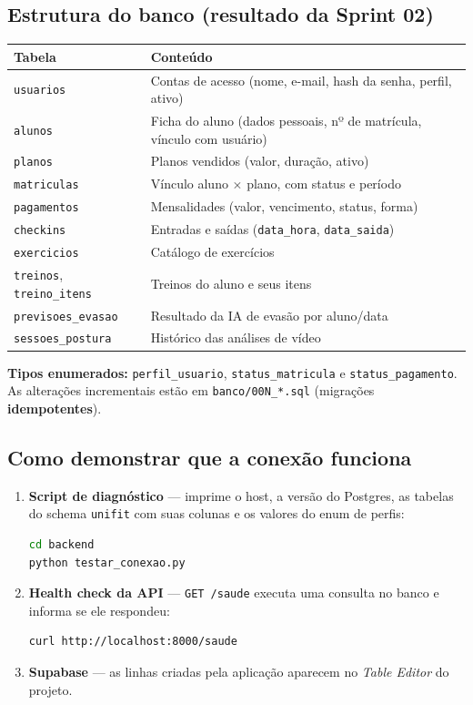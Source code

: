 \documentclass[11pt,a4paper,final]{article}
\newcommand{\cod}[1]{\texttt{#1}}
\begin{document}
\subsection{Estrutura do banco (resultado da Sprint 02)}

\begin{xltabular}{\textwidth}{l Y}
  \toprule
  \textbf{Tabela} & \textbf{Conteúdo} \\
  \midrule
  \endhead
  \cod{usuarios}          & Contas de acesso (nome, e-mail, hash da senha, perfil, ativo) \\
  \cod{alunos}            & Ficha do aluno (dados pessoais, nº de matrícula, vínculo com usuário) \\
  \cod{planos}            & Planos vendidos (valor, duração, ativo) \\
  \cod{matriculas}        & Vínculo aluno $\times$ plano, com status e período \\
  \cod{pagamentos}        & Mensalidades (valor, vencimento, status, forma) \\
  \cod{checkins}          & Entradas e saídas (\cod{data\_hora}, \cod{data\_saida}) \\
  \cod{exercicios}        & Catálogo de exercícios \\
  \cod{treinos}, \cod{treino\_itens} & Treinos do aluno e seus itens \\
  \cod{previsoes\_evasao} & Resultado da IA de evasão por aluno/data \\
  \cod{sessoes\_postura}  & Histórico das análises de vídeo \\
  \bottomrule
\end{xltabular}

\textbf{Tipos enumerados:} \cod{perfil\_usuario}, \cod{status\_matricula} e \cod{status\_pagamento}.
As alterações incrementais estão em \cod{banco/00N\_*.sql} (migrações \textbf{idempotentes}).

\subsection{Como demonstrar que a conexão funciona}

\begin{enumerate}
  \item \textbf{Script de diagnóstico} --- imprime o host, a versão do Postgres, as tabelas do schema
        \cod{unifit} com suas colunas e os valores do enum de perfis:
\begin{lstlisting}[language=bash]
cd backend
python testar_conexao.py
\end{lstlisting}
  \item \textbf{Health check da API} --- \cod{GET /saude} executa uma consulta no banco e informa se ele
        respondeu:
\begin{lstlisting}[language=bash]
curl http://localhost:8000/saude
\end{lstlisting}
  \item \textbf{Supabase} --- as linhas criadas pela aplicação aparecem no \textit{Table Editor} do projeto.
\end{enumerate}
\end{document}

